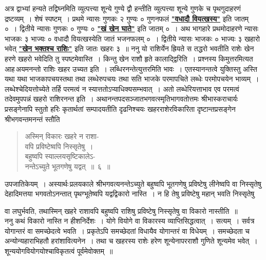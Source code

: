 \documentclass[11pt, openany]{book}
\begin{document}
 अत्र द्वाभ्यां हन्यते तद्विघ्नमिति व्युत्पत्त्या शून्ये गुण्ये द्वौ हन्तीति व्युत्पत्त्या शून्ये गुणके च पृथगुदाहरणं द्रष्टव्यम्~। शेषं स्पष्टम्~। प्रथमे न्यासः गुणकः २ गुण्यः ० गुणनफलं \hyperref[1.5]{\textbf{"वधादौ वियत्खस्य"}} इति जातम् ०~। द्वितीये न्यासः गुणकः ० गुण्यः ० \hyperref[1.5]{\textbf{"खं खेन घाते"}} इति जातम् ०~। अथ भागहारे प्रथमोदाहरणे न्यासः भाजकः ३ भाज्यः ० वधादौ वियत्खस्येति जातं भजनफलम् ०~। द्वितीये न्यासः भाजकः ० भाज्यः ३ खहारो भवेत् \hyperref[1.5]{\textbf{"खेन भक्तश्च राशिः"}} इति जातः खहरः ३~॥ ननु यो राशिर्येन ह्रियते स तद्धरो भवतीति राशेः खेन हरणे खहरो भवेदिति तु स्पष्टमेवास्ति~। किन्तु खेन राशौ हृते कालाद्द्विरिति~। प्रश्नस्य किमुत्तरमित्यत आह\textendash \,अयमनन्तो राशिः खहर उच्यत इति~। लब्धिरनन्तेत्युत्तरमिति भावः~। एतस्यानन्तत्वे 
युक्तिस्तु अस्ति यथा यथा भाजकापचयस्तथा तथा लब्धेरुपचयः तथा सति 
भाजके परमापचिते लब्धेः परमोपचयेन भाव्यम्~। लब्धेश्चेदियत्तोच्येते 
तर्हि परमत्वं न स्यात्ततोऽप्याधिक्यसम्भवात्~। अतो लब्धेरियत्ताभाव एव
परमत्वं तदेवमुपपन्नं खहरो राशिरनन्त इति~। अथानन्तपदसञ्जातभगवत्स्मृतिभागवतोत्तमः श्रीभास्कराचार्यः प्रसङ्गेनापि स्तुतो हरिः कृतार्थतां सम्पादयतीति दृढनिश्चयः खहरराशेरविकारिता दृष्टान्तप्रसङ्गेन श्रीभगवन्तमनन्तं
स्तौति\textendash  
\begin{quote}
    \bs
     अस्मिन् विकारः खहरे न राशा- \\

\vspace{-7mm}
\hspace{1cm} वपि प्रविष्टेष्वपि निस्सृतेषु~। \\

 \vspace{-7mm}
 बहुष्वपि स्याल्लयसृष्टिकालेऽ-\\

\vspace{-7mm}
\hspace{1cm} नन्तेऽच्युते भूतगणेषु यद्वत्~॥~६~॥
\end{quote}
 
 उपजातिकेयम्~। अस्यार्थः\textendash \,प्रलयकाले श्रीभगवत्यनन्तेऽच्युते बहुष्वपि भूतगणेषु प्रविष्टेषु लीनेष्वपि वा निस्सृतेषु देहादिमत्तया भगवतोऽनन्तात्
पृथग्भूतेष्वपि यद्वद्विकारो नास्ति~। न हि तेषु प्रविष्टेषु महान् भवति
निस्सृतेषु
\newpage

\noindent वा लघुर्भवति, तथास्मिन् खहरे राशावपि बहुष्वपि राशिषु प्रविष्टेषु 
निस्सृतेषु वा विकारो नास्तीति~॥ \\

\vspace{-3mm}
 ननु कथं विकारो नास्ति न हीशनिर्देशः~। योगे वियोगे वा 
विकारस्य व्याप्तिसिद्धत्वात्~। सत्यम्~। सर्वत्र योगान्तरं वा समच्छेदत्वे
भवति~। प्रकृतेऽपि समच्छेदतां विधायैव योगान्तरं वा विधेयम्~। समच्छेदता 
च अन्योन्यहाराभिहतौ हरांशावित्यनेन~। तथा च खहरस्य राशेः हरेण 
शून्येनापरराशौ गुणिते शून्यमेव भवेत्~। शून्ययोगवियोगयोश्चाविकृतत्वं 
पूर्वमेवोक्तम्~॥ \\
\end{document}
